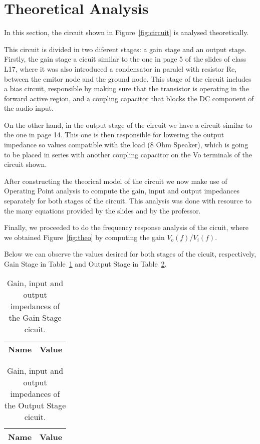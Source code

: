 \section{Theoretical Analysis}
\label{sec:analysis}
\tab In this section, the circuit shown in Figure~\ref{fig:circuit} is analysed theoretically.

This circuit is divided in two diferent stages: a gain stage and an output stage. Firstly, the gain stage a cicuit similar to the one in page 5 of the slides of class L17, where it was also introduced a condensator in paralel with resistor Re, between the emitor node and the ground node. This stage of the circuit includes a bias circuit, responsible by making sure that the transistor is operating in the forward active region, and a coupling capacitor that blocks the DC component of the audio input.

On the other hand, in the output stage of the circuit we have a circuit similar to the one in page 14. This one is then responsible for lowering the output impedance so values compatible with the load (8 Ohm Speaker), which is going to be placed in series with another coupling capacitor on the Vo terminals of the circuit shown.

After constructing the theorical model of the circuit we now make use of Operating Point analysis to compute the gain, input and output impedances separately for both stages of the circuit. This analysis was done with resource to the many equations provided by the slides and by the professor.

Finally, we proceeded to do the frequency response analysis of the cicuit, where we obtained Figure~\ref{fig:theo} by computing the gain $V_o(f)$/$V_i(f)$.

Below we can observe the values desired for both stages of the cicuit, respectively, Gain Stage in Table~\ref{tab:gain} and Output Stage in Table~\ref{tab:output}.

\begin{table}[H]
  \centering
  \begin{tabular}{|l|r|}
    \hline    
    {\bf Name} & {\bf Value} \\ \hline
	
  \end{tabular}
  \caption{Gain, input and output impedances of the Gain Stage cicuit.}
  \label{tab:gain}
\end{table}

\begin{table}[H]
  \centering
  \begin{tabular}{|l|r|}
    \hline    
    {\bf Name} & {\bf Value} \\ \hline
	
  \end{tabular}
  \caption{Gain, input and output impedances of the Output Stage cicuit.}
  \label{tab:output}
\end{table}

